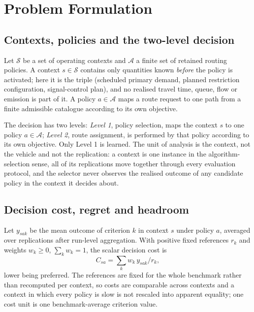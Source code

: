 
\section{Problem Formulation}

\subsection{Contexts, policies and the two-level decision}

Let $\mathcal{S}$ be a set of operating contexts and $\mathcal{A}$ a finite set of
retained routing policies. A context $s\in\mathcal{S}$ contains only quantities known
\emph{before} the policy is activated; here it is the triple (scheduled primary demand,
planned restriction configuration, signal-control plan), and no realised travel time,
queue, flow or emission is part of it. A policy $a\in\mathcal{A}$ maps a route request to
one path from a finite admissible catalogue according to its own objective.

The decision has two levels: \emph{Level 1}, policy selection, maps the context $s$ to one
policy $a\in\mathcal{A}$; \emph{Level 2}, route assignment, is performed by that policy
according to its own objective. Only Level 1 is learned. The unit of analysis is the context, not the vehicle and not the
replication: a context is one instance in the algorithm-selection sense, all of its
replications move together through every evaluation protocol, and the selector never
observes the realised outcome of any candidate policy in the context it decides about.

\subsection{Decision cost, regret and headroom}

Let $y_{sak}$ be the mean outcome of criterion $k$ in context $s$ under policy $a$,
averaged over replications after run-level aggregation. With positive fixed references
$r_k$ and weights $w_k\ge0$, $\sum_k w_k=1$, the scalar decision cost is
\begin{equation}
C_{sa}=\sum_k w_k\,y_{sak}/r_k ,
\label{eq:cost}
\end{equation}
lower being preferred. The references are fixed for the whole benchmark rather than
recomputed per context, so costs are comparable across contexts and a context in which
every policy is slow is not rescaled into apparent equality; one cost unit is one
benchmark-average criterion value.

